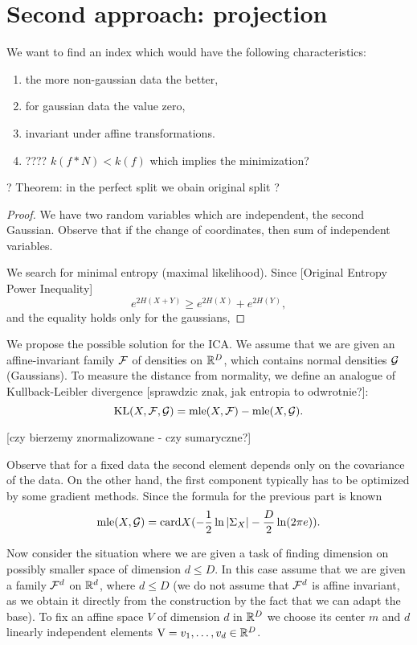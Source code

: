 
\section{Second approach: projection}

We want to find an index which would have the following characteristics:
\begin{enumerate}
\item the more non-gaussian data the better,
\item for gaussian data the value zero,
\item invariant under affine transformations.
\item ???? $k(f * N) <k(f)$ which implies the minimization?
\end{enumerate}

\begin{theorem}
? Theorem: in the perfect split we obain original split ?
\end{theorem}

\begin{proof}
We have two random variables which are independent, the second Gaussian.
Observe that if the change of coordinates, then sum of independent variables.

We search for minimal entropy (maximal likelihood). Since
[Original Entropy Power Inequality]
$$
e^{2H(X+Y)} \geq e^{2H(X)}+e^{2H(Y)},
$$
and the equality holds only for the gaussians, 
\end{proof}

We propose the possible solution for the ICA. We assume that we are given an affine-invariant family
$\mathcal{F}$ of densities on $\mathbb{R}^D$, which contains normal densities $\mathcal{G}$ (Gaussians). To measure the distance from 
normality, we define an analogue of Kullback-Leibler divergence [sprawdzic znak, jak entropia to odwrotnie?]:
$$
\mathrm{KL}(X,\mathcal{F},\mathcal{G})=\mathrm{mle}(X,\mathcal{F})-\mathrm{mle}(X,\mathcal{G}).
$$

[czy bierzemy znormalizowane - czy sumaryczne?]

Observe that for a fixed data the second element depends only on the covariance of the data. On the other hand, the first component typically has to be optimized by some gradient methods. Since the formula for the previous part is known
$$
\mathrm{mle}(X,\mathcal{G})=\mathrm{card} X(-\frac{1}{2}\ln |\Sigma_X|-\frac{D}{2}\ln(2\pi e)).
$$

Now consider the situation where we are given a task of finding dimension on possibly smaller space of dimension $d \leq D$.
In this case assume that we are given a family $\mathcal{F}^d$ on $\mathbb{R}^d$, where $d \leq D$ (we do not assume that $\mathcal{F}^d$ is affine invariant, as we obtain it directly from the construction by the fact that we can adapt the base).
To fix an affine space $V$ of dimension $d$ in $\mathbb{R}^D$ we choose its center $m$
and $d$ linearly independent elements $\mathrm{V}=v_1,\ldots,v_d \in \mathbb{R}^D$.

